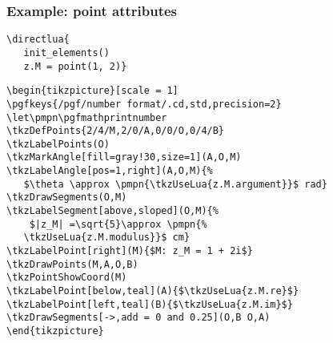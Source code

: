 \subsubsection{Example: point attributes}
\label{ssub:example_point_attributes}

\hspace*{\fill}

\begin{verbatim}
\directlua{
   init_elements()
   z.M = point(1, 2)}
\end{verbatim}
\let\pmpn\pgfmathprintnumber
\DeleteShortVerb{\|}

\begin{verbatim}
\begin{tikzpicture}[scale = 1]
\pgfkeys{/pgf/number format/.cd,std,precision=2}
\let\pmpn\pgfmathprintnumber
\tkzDefPoints{2/4/M,2/0/A,0/0/O,0/4/B}
\tkzLabelPoints(O)
\tkzMarkAngle[fill=gray!30,size=1](A,O,M)
\tkzLabelAngle[pos=1,right](A,O,M){%
   $\theta \approx \pmpn{\tkzUseLua{z.M.argument}}$ rad}
\tkzDrawSegments(O,M)
\tkzLabelSegment[above,sloped](O,M){%
    $|z_M| =\sqrt{5}\approx \pmpn{%
   \tkzUseLua{z.M.modulus}}$ cm}
\tkzLabelPoint[right](M){$M: z_M = 1 + 2i$}
\tkzDrawPoints(M,A,O,B)
\tkzPointShowCoord(M)
\tkzLabelPoint[below,teal](A){$\tkzUseLua{z.M.re}$}
\tkzLabelPoint[left,teal](B){$\tkzUseLua{z.M.im}$}
\tkzDrawSegments[->,add = 0 and 0.25](O,B O,A)
\end{tikzpicture}
\end{verbatim}


